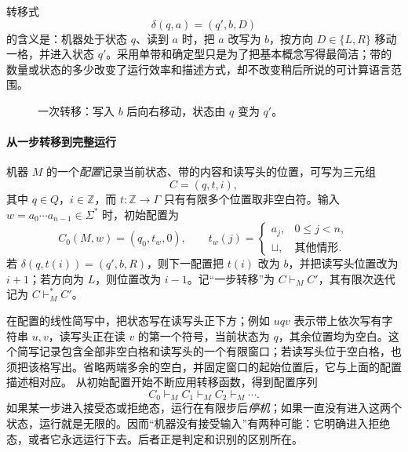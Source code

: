 \documentclass[lang=cn,a4paper,fontset=none,zihao=false,10pt,openany,twoside]{beautybook}
\numberwithin{algorithm}{chapter}
\begin{document}
转移式
\[
 \delta(q,a)=(q',b,D)
\]
的含义是：机器处于状态 $q$、读到 $a$ 时，把 $a$ 改写为 $b$，按方向 $D\in\{L,R\}$ 移动一格，并进入状态 $q'$。采用单带和确定型只是为了把基本概念写得最简洁；带的数量或状态的多少改变了运行效率和描述方式，却不改变稍后所说的可计算语言范围。

\begin{figure}[H]
\centering
{}
\caption{一次转移：写入 $b$ 后向右移动，状态由 $q$ 变为 $q'$。}\label{fig:tm-step}
\end{figure}

\paragraph{从一步转移到完整运行}
\begin{definition}[配置与运行]
机器 $M$ 的一个\emph{配置}记录当前状态、带的内容和读写头的位置，可写为三元组
\[
 C=(q,t,i),
\]
其中 $q\in Q$，$i\in\mathbb Z$，而 $t:\mathbb Z\to\Gamma$ 只有有限多个位置取非空白符。输入 $w=a_0\cdots a_{n-1}\in\Sigma^*$ 时，初始配置为
\[
 C_0(M,w)=(q_0,t_w,0),\qquad
 t_w(j)=
 \begin{cases}a_j,&0\leq j<n,\\\sqcup,&\text{其他情形}.
 \end{cases}
\]
若 $\delta(q,t(i))=(q',b,R)$，则下一配置把 $t(i)$ 改为 $b$，并把读写头位置改为 $i+1$；若方向为 $L$，则位置改为 $i-1$。记“一步转移”为 $C\vdash_M C'$，其有限次迭代记为 $C\vdash_M^* C'$。
\end{definition}

在配置的线性简写中，把状态写在读写头正下方；例如 $u q v$ 表示带上依次写有字符串 $u,v$，读写头正在读 $v$ 的第一个符号，当前状态为 $q$，其余位置均为空白。这个简写记录包含全部非空白格和读写头的一个有限窗口；若读写头位于空白格，也须把该格写出。省略两端多余的空白，并固定窗口的起始位置后，它与上面的配置描述相对应。
从初始配置开始不断应用转移函数，得到配置序列
\[
 C_0\vdash_M C_1\vdash_M C_2\vdash_M\cdots.
\]
如果某一步进入接受态或拒绝态，运行在有限步后\emph{停机}；如果一直没有进入这两个状态，运行就是无限的。因而“机器没有接受输入”有两种可能：它明确进入拒绝态，或者它永远运行下去。后者正是判定和识别的区别所在。
\end{document}
